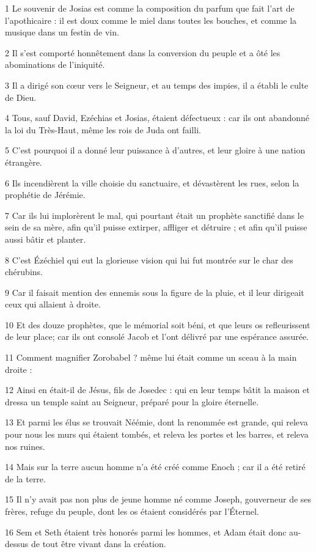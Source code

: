 \par 1 Le souvenir de Josias est comme la composition du parfum que fait l'art de l'apothicaire : il est doux comme le miel dans toutes les bouches, et comme la musique dans un festin de vin.
\par 2 Il s'est comporté honnêtement dans la conversion du peuple et a ôté les abominations de l'iniquité.
\par 3 Il a dirigé son cœur vers le Seigneur, et au temps des impies, il a établi le culte de Dieu.
\par 4 Tous, sauf David, Ezéchias et Josias, étaient défectueux : car ils ont abandonné la loi du Très-Haut, même les rois de Juda ont failli.
\par 5 C'est pourquoi il a donné leur puissance à d'autres, et leur gloire à une nation étrangère.
\par 6 Ils incendièrent la ville choisie du sanctuaire, et dévastèrent les rues, selon la prophétie de Jérémie.
\par 7 Car ils lui implorèrent le mal, qui pourtant était un prophète sanctifié dans le sein de sa mère, afin qu'il puisse extirper, affliger et détruire ; et afin qu'il puisse aussi bâtir et planter.
\par 8 C'est Ézéchiel qui eut la glorieuse vision qui lui fut montrée sur le char des chérubins.
\par 9 Car il faisait mention des ennemis sous la figure de la pluie, et il leur dirigeait ceux qui allaient à droite.
\par 10 Et des douze prophètes, que le mémorial soit béni, et que leurs os refleurissent de leur place; car ils ont consolé Jacob et l'ont délivré par une espérance assurée.
\par 11 Comment magnifier Zorobabel ? même lui était comme un sceau à la main droite :
\par 12 Ainsi en était-il de Jésus, fils de Josedec : qui en leur temps bâtit la maison et dressa un temple saint au Seigneur, préparé pour la gloire éternelle.
\par 13 Et parmi les élus se trouvait Néémie, dont la renommée est grande, qui releva pour nous les murs qui étaient tombés, et releva les portes et les barres, et releva nos ruines.
\par 14 Mais sur la terre aucun homme n'a été créé comme Enoch ; car il a été retiré de la terre.
\par 15 Il n'y avait pas non plus de jeune homme né comme Joseph, gouverneur de ses frères, refuge du peuple, dont les os étaient considérés par l'Éternel.
\par 16 Sem et Seth étaient très honorés parmi les hommes, et Adam était donc au-dessus de tout être vivant dans la création.

